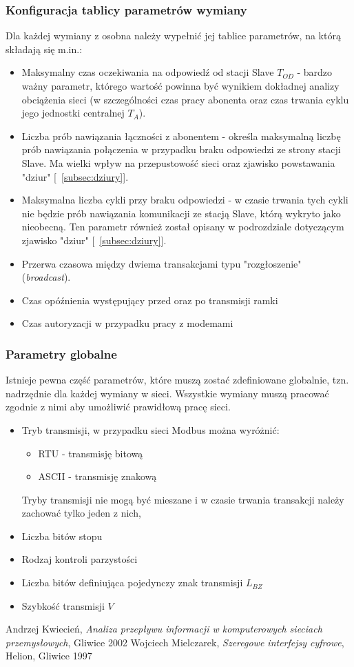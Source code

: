 \documentclass[a4paper,twoside]{article}
\begin{document}
	\subsubsection{Konfiguracja tablicy parametrów wymiany}
	Dla każdej wymiany z osobna należy wypełnić jej tablice parametrów, na którą składają się m.in.:
	\begin{itemize}
		\item Maksymalny czas oczekiwania na odpowiedź od stacji Slave $ T_{OD} $ - bardzo ważny parametr, którego wartość powinna być wynikiem dokładnej analizy obciążenia sieci (w szczególności czas pracy abonenta oraz czas trwania cyklu jego jednostki centralnej $ T_{A} $).
		\item Liczba prób nawiązania łączności z abonentem - określa maksymalną liczbę prób nawiązania połączenia w przypadku braku odpowiedzi ze strony stacji Slave. Ma wielki wpływ na przepustowość sieci oraz zjawisko powstawania "dziur" [~\ref{subsec:dziury}].
		\item Maksymalna liczba cykli przy braku odpowiedzi - w czasie trwania tych cykli nie będzie prób nawiązania komunikacji ze stacją Slave, którą wykryto jako nieobecną. Ten parametr również został opisany w podrozdziale dotyczącym zjawisko "dziur" [~\ref{subsec:dziury}].
		\item Przerwa czasowa między dwiema transakcjami typu "rozgłoszenie" (\emph{broadcast}).
		\item Czas opóźnienia występujący przed oraz po transmisji ramki
		\item Czas autoryzacji w przypadku pracy z modemami
	\end{itemize}
	\subsubsection{Parametry globalne}
	Istnieje pewna część parametrów, które muszą zostać zdefiniowane globalnie, tzn. nadrzędnie dla każdej wymiany w sieci. Wszystkie wymiany muszą pracować zgodnie z nimi aby umożliwić prawidłową pracę sieci.
	\begin{itemize}
		\item Tryb transmisji, w przypadku sieci Modbus można wyróżnić:
		\begin{itemize}
			\item RTU - transmisję bitową
			\item ASCII - transmisję znakową
		\end{itemize}
		Tryby transmisji nie mogą być mieszane i w czasie trwania transakcji należy zachować tylko jeden z nich,
		\item Liczba bitów stopu
		\item Rodzaj kontroli parzystości
		\item Liczba bitów definiująca pojedynczy znak transmisji $ L_{BZ} $
		\item Szybkość transmisji $ V $
	\end{itemize}
	









\newpage
\begin{thebibliography}{2}
	 Andrzej Kwiecień, \textit{Analiza przepływu informacji w komputerowych sieciach przemysłowych}, Gliwice 2002
	 Wojciech Mielczarek, \textit{Szeregowe interfejsy cyfrowe}, Helion, Gliwice 1997
\end{thebibliography}
\end{document}
